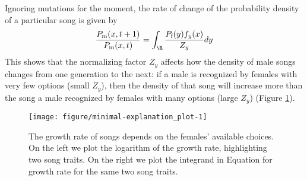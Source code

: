 \documentclass{article}\usepackage[]{graphicx}\usepackage[]{color}
\makeatletter
\def\maxwidth{ %
  \ifdim\Gin@nat@width>\linewidth
    \linewidth
  \else
    \Gin@nat@width
  \fi
}
\newenvironment{knitrout}{}{} %
\makeatother
\begin{document}
Ignoring mutations for the moment, the rate of change of the probability density of a particular song is given by 
\begin{equation}
\frac{P_\text{m}(x,t+1)}{P_\text{m}(x,t)}= \int _\R\frac{ P_\text{f}(y)f_y(x)}{Z_y}dy \label{growth}
\end{equation}
This shows that the normalizing factor $Z_y$ affects how the density of male songs changes from one generation to the next: if a male is recognized by females with very few options (small $Z_y$), then the density of that song will increase more than the song a male recognized by females with many options (large $Z_y$) (Figure \ref{fig:explanation_plot}).



\begin{knitrout}\footnotesize
{}\color{fgcolor}\begin{figure}

{\centering \texttt{[image: figure/minimal-explanation\_plot-1]} 

}

\caption[The growth rate of songs depends on the females' available choices]{The growth rate of songs depends on the females' available choices. On the left we plot the logarithm of the growth rate, highlighting two song traits. On the right we plot the integrand in Equation for growth rate for the same two song traits.}\label{fig:explanation_plot}
\end{figure}


\end{knitrout}




\end{document}

